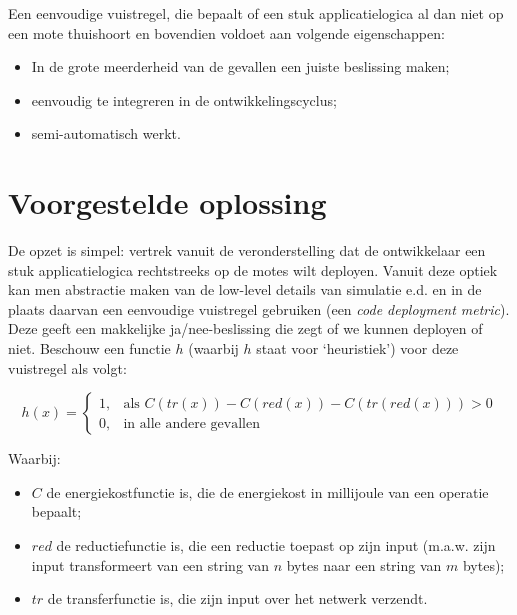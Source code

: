 \documentclass[11pt]{article}
\begin{document}
Een eenvoudige vuistregel, die bepaalt of een stuk applicatielogica al dan niet op een mote thuishoort en bovendien voldoet aan volgende eigenschappen:
\begin{itemize}
\item In de grote meerderheid van de gevallen een juiste beslissing maken;
\item eenvoudig te integreren in de ontwikkelingscyclus;
\item semi-automatisch werkt.
\end{itemize}

\section{Voorgestelde oplossing}
De opzet is simpel: vertrek vanuit de veronderstelling dat de ontwikkelaar een
stuk applicatielogica rechtstreeks op de motes wilt deployen. Vanuit deze optiek
kan men abstractie maken van de low-level details van simulatie e.d. en in de plaats daarvan een eenvoudige vuistregel gebruiken (een \textit{code
deployment metric}). Deze geeft een makkelijke ja/nee-beslissing die zegt of we
kunnen deployen of niet. Beschouw een functie $h$ (waarbij $h$ staat voor
`heuristiek') voor deze vuistregel als volgt:


\[
h(x)= 
\begin{cases}
  1, & \text{als } C(tr(x)) - C(red(x)) - C(tr(red(x))) > 0  \\
  0, & \text{in alle andere gevallen}
\end{cases}
\]

Waarbij:

\begin{itemize}
\item $C$ de energiekostfunctie is, die de energiekost in millijoule van een
operatie bepaalt;
\item $red$ de reductiefunctie is, die een reductie toepast op zijn input
(m.a.w. zijn input transformeert van een string van $n$ bytes naar een string
van $m$ bytes);
\item $tr$ de transferfunctie is, die zijn input over het netwerk verzendt.
\end{itemize}
\end{document}
